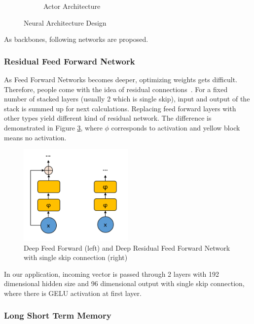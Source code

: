 \documentclass[a4paper, 12pt]{article} %
\begin{document}
\begin{figure}
\begin{subfigure}{.35\textwidth}
		\caption{Actor Architecture}
		\label{fig:actor_net}
	\end{subfigure}
	\caption{Neural Architecture Design}
	\label{fig:nets}
\end{figure}

As backbones, following networks are proposed. 

\subsubsection{Residual Feed Forward Network}

As Feed Forward Networks becomes deeper, optimizing weights gets difficult. 
Therefore, people come with the idea of residual connections~\cite{he_deep_2015}. 
For a fixed number of stacked layers (usually 2 which is single skip), input and output of the stack is summed up for next calculations. 
Replacing feed forward layers with other types yield different kind of residual network. 
The difference is demonstrated in Figure \ref{fig:rffnn_ffnn}, where $\phi$ corresponds to activation and yellow block means no activation. 

\begin{figure}
	\centering
	\includegraphics[width=0.5\textwidth]{figures/ml_theory/rffnn_vs_ffnn.png}
	\caption{Deep Feed Forward (left) and Deep Residual Feed Forward Network with single skip connection (right)}
	\label{fig:rffnn_ffnn}
\end{figure}

In our application, incoming vector is passed through 2 layers with 192 dimensional hidden size and 96 dimensional output with single skip connection, where there is GELU activation at first layer. 
 
\subsubsection{Long Short Term Memory}
\end{document}
